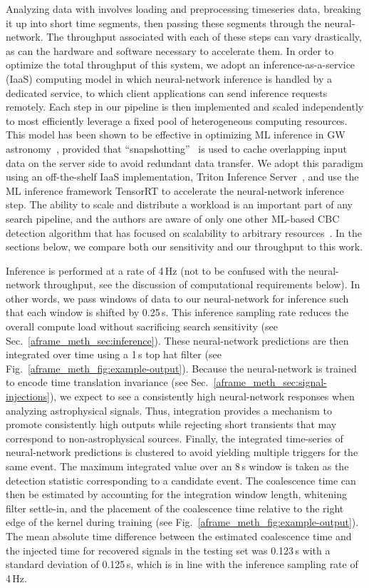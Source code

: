 \begin{refsection}
Analyzing data with \aframe involves loading and preprocessing timeseries data, breaking it up into short time segments, then passing these segments through the neural-network. 
The throughput associated with each of these steps can vary drastically, as can the hardware and software necessary to accelerate them. 
In order to optimize the total throughput of this system, we adopt an inference-as-a-service (IaaS) computing model in which neural-network inference is handled by a dedicated service, to which client applications can send inference requests remotely. 
Each step in our pipeline is then implemented and scaled independently to most efficiently leverage a fixed pool of heterogeneous computing resources. 
This model has been shown to be effective in optimizing ML inference in GW astronomy~\cite{iaas}, provided that ``snapshotting''~\cite{hermes} is used to cache overlapping input data on the server side to avoid redundant data transfer. 
We adopt this paradigm using an off-the-shelf IaaS implementation, Triton Inference Server~\cite{NVIDIA_Corporation_Triton_Inference_Server}, and use the ML inference framework TensorRT to accelerate the neural-network inference step. 
The ability to scale and distribute a workload is an important part of any search pipeline, and the authors are aware of only one other ML-based CBC detection algorithm that has focused on scalability to arbitrary resources~\cite{huerta2021}. 
In the sections below, we compare both our sensitivity and our throughput to this work.

Inference is performed at a rate of 4\,Hz (not to be confused with the neural-network throughput, see the discussion of computational requirements below). 
In other words, we pass windows of data to our neural-network for inference such that each window is shifted by 0.25\,s. 
This inference sampling rate reduces the overall compute load without sacrificing search sensitivity (see Sec.~\ref{aframe_meth_sec:inference}).
These neural-network predictions are then integrated over time using a 1\,s top hat filter (see Fig.~\ref{aframe_meth_fig:example-output}). 
Because the neural-network is trained to encode time translation invariance (see Sec.~\ref{aframe_meth_sec:signal-injections}), we expect to see a consistently high neural-network responses when analyzing astrophysical signals.
Thus, integration provides a mechanism to promote consistently high outputs while rejecting short transients that may correspond to non-astrophysical sources.
Finally, the integrated time-series of neural-network predictions is clustered to avoid yielding multiple triggers for the same event. 
The maximum integrated value over an 8\,s window is taken as the detection statistic  corresponding to a candidate event.
The coalescence time can then be estimated by accounting for the integration window length, whitening filter settle-in, and the placement of the coalescence time relative to the right edge of the kernel during training (see Fig.~\ref{aframe_meth_fig:example-output}).
The mean absolute time difference between the estimated coalescence time and the injected time for recovered signals in the testing set was 0.123\,s with a standard deviation of 0.125\,s, which is in line with the inference sampling rate of 4\,Hz.


\end{refsection}
